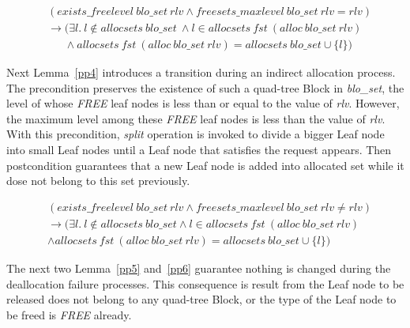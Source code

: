 \begin{lemma} 
\label{pp3}
\end{lemma}
\vspace{-7pt}
{\footnotesize
\begin{align*}
&(exists\_freelevel\ blo\_set\ rlv \wedge freesets\_maxlevel\ blo\_set\ rlv = rlv) \\ &\longrightarrow (\exists l.\ l \notin allocsets\ blo\_set\ \wedge l \in allocsets\ fst\ (alloc\ blo\_set\ rlv) \\
&\ \ \ \ \ \ \ \wedge allocsets\ fst\ (alloc\ blo\_set\ rlv) = allocsets\ blo\_set \cup \lbrace l \rbrace)
\end{align*}
}
\vspace{-12pt}

Next Lemma~\ref{pp4} introduces a transition during an indirect allocation process. The precondition preserves the existence of such a quad-tree Block in \emph{blo\_set}, the level of whose \emph{FREE} leaf nodes is less than or equal to the value of \emph{rlv}. However, the maximum level among these \emph{FREE} leaf nodes is less than the value of \emph{rlv}. With this precondition, \emph{split} operation is invoked to divide a bigger Leaf node into small Leaf nodes until a Leaf node that satisfies the request appears. Then postcondition guarantees that a new Leaf node is added into allocated set while it dose not belong to this set previously.

\begin{lemma} 
\label{pp4}
\end{lemma}
\vspace{-7pt}
{\footnotesize
\begin{align*}
&(exists\_freelevel\ blo\_set\ rlv \wedge freesets\_maxlevel\ blo\_set\ rlv \neq rlv) \\
&\longrightarrow (\exists l.\ l \notin allocsets\ blo\_set \wedge l \in allocsets\ fst\ (alloc\ blo\_set\ rlv) \\
&\wedge allocsets\ fst\ (alloc\ blo\_set\ rlv) = allocsets\ blo\_set \cup \lbrace l \rbrace)
\end{align*}
}
\vspace{-12pt}

The next two Lemma~\ref{pp5} and~\ref{pp6} guarantee nothing is changed during the deallocation failure processes. This consequence is result from the Leaf node to be released does not belong to any quad-tree Block, or the type of the Leaf node to be freed is \emph{FREE} already.

